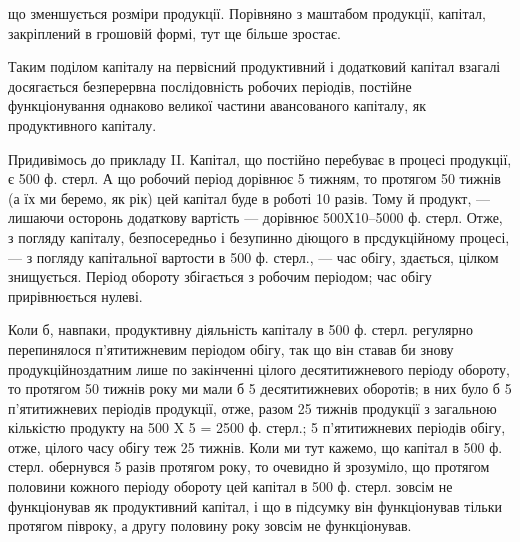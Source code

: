 \parcont{}  %
що зменшується розміри продукції. Порівняно з маштабом продукції, капітал,
закріплений в грошовій формі, тут ще більше зростає.

Таким поділом капіталу на первісний продуктивний і додатковий капітал
взагалі досягається безперервна послідовність робочих періодів, постійне
функціонування однаково великої частини авансованого капіталу,
як продуктивного капіталу.

Придивімось до прикладу II. Капітал, що постійно перебуває в процесі
продукції, є 500 ф. стерл. А що робочий період дорівнює 5 тижням,
то протягом 50 тижнів (а їх ми беремо, як рік) цей капітал буде в
роботі 10 разів. Тому й продукт, — лишаючи осторонь додаткову вартість
— дорівнює 500X10--5000 ф.  стерл. Отже, з погляду капіталу,
безпосередньо і безупинно діющого в прсдукційному процесі, — з погляду
капітальної вартости в 500 ф. стерл., — час обігу, здається, цілком
знищується. Період обороту збігається з робочим періодом; час обігу прирівнюється
нулеві.

Коли б, навпаки, продуктивну діяльність капіталу в 500 ф. стерл. регулярно
перепинялося п’ятитижневим періодом обігу, так що він ставав
би знову продукційноздатним лише по закінченні цілого десятитижневого
періоду обороту, то протягом 50 тижнів року ми мали б 5 десятитижневих
оборотів; в них було б 5 п’ятитижневих періодів продукції, отже,
разом 25 тижнів продукції з загальною кількістю продукту на 500 X 5 = 2500
ф. стерл.; 5 п’ятитижневих періодів обігу, отже, цілого часу обігу теж
25 тижнів. Коли ми тут кажемо, що капітал в 500 ф. стерл. обернувся
5 разів протягом року, то очевидно й зрозуміло, що протягом половини
кожного періоду обороту цей капітал в 500 ф. стерл. зовсім не функціонував
як продуктивний капітал, і що в підсумку він функціонував тільки
протягом півроку, а другу половину року зовсім не функціонував.


